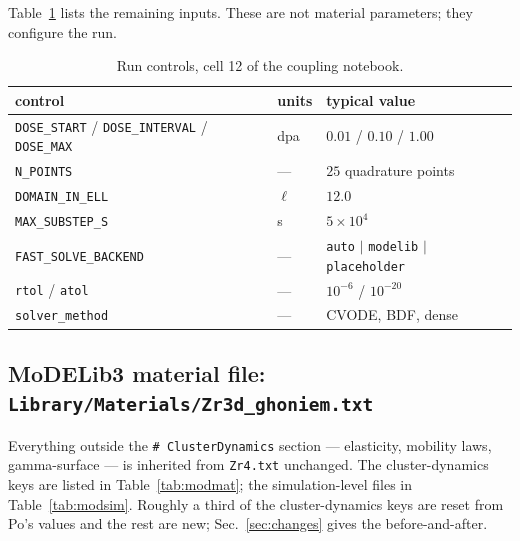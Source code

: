 \documentclass[11pt]{article}
\newcommand{\MoD}{\textsf{MoDELib3}}
\newcommand{\code}[1]{\texttt{\small #1}}
\newcommand{\file}[1]{\texttt{\footnotesize #1}}
\begin{document}
Table~\ref{tab:controls} lists the remaining inputs. These are not material
parameters; they configure the run.

\begin{table}[htbp]
\centering
\caption{Run controls, cell 12 of the coupling notebook.}
\label{tab:controls}
\begin{tabular}{@{}lll@{}}
\toprule
control & units & typical value \\
\midrule
\code{DOSE\_START} / \code{DOSE\_INTERVAL} / \code{DOSE\_MAX} & dpa & $0.01$ / $0.10$ / $1.00$ \\
\code{N\_POINTS} & --- & $25$ quadrature points \\
\code{DOMAIN\_IN\_ELL} & $\ell$ & $12.0$ \\
\code{MAX\_SUBSTEP\_S} & s & $5\times10^{4}$ \\
\code{FAST\_SOLVE\_BACKEND} & --- & \code{auto} $\mid$ \code{modelib} $\mid$ \code{placeholder} \\
\code{rtol} / \code{atol} & --- & $10^{-6}$ / $10^{-20}$ \\
\code{solver\_method} & --- & CVODE, BDF, dense \\
\bottomrule
\end{tabular}
\end{table}

\subsection{\MoD{} material file: \file{Library/Materials/Zr3d\_ghoniem.txt}}

Everything outside the \code{\# ClusterDynamics} section --- elasticity, mobility
laws, gamma-surface --- is inherited from \file{Zr4.txt} unchanged. The
cluster-dynamics keys are listed in Table~\ref{tab:modmat}; the simulation-level
files in Table~\ref{tab:modsim}. Roughly a third of the cluster-dynamics keys are
reset from Po's values and the rest are new; Sec.~\ref{sec:changes} gives the
before-and-after.
\end{document}
